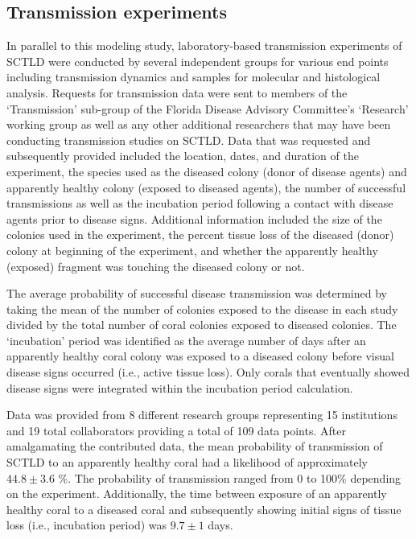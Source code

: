 \documentclass[utf8]{frontiersSCNS}
\begin{document}
\subsection{Transmission experiments}
In parallel to this modeling study, laboratory-based transmission experiments of SCTLD were conducted by several independent groups for various end points including transmission dynamics and samples for molecular and histological analysis. Requests for transmission data were sent to members of the ‘Transmission’ sub-group of the Florida Disease Advisory Committee’s ‘Research’ working group as well as any other additional researchers that may have been conducting transmission studies on SCTLD. Data that was requested and subsequently provided included the location, dates, and duration of the experiment, the species used as the diseased colony (donor of disease agents) and apparently healthy colony (exposed to diseased agents), the number of successful transmissions as well as the incubation period following a contact with disease agents prior to disease signs. Additional information included the size of the colonies used in the experiment, the percent tissue loss of the diseased (donor) colony at beginning of the experiment, and whether the apparently healthy (exposed) fragment was touching the diseased colony or not. 

The average probability of successful disease transmission was determined by taking the mean of the number of colonies exposed to the disease in each study divided by the total number of coral colonies exposed to diseased colonies. The ‘incubation’ period was identified as the average number of days after an apparently healthy coral colony was exposed to a diseased colony before visual disease signs occurred (i.e., active tissue loss). Only corals that eventually showed disease signs were integrated within the incubation period calculation. 

Data was provided from 8 different research groups representing 15 institutions and 19 total collaborators providing a total of 109 data points. After amalgamating the contributed data, the mean probability of transmission of SCTLD to an apparently healthy coral had a likelihood of approximately $44.8 \pm 3.6$ \%. The probability of transmission ranged from 0 to 100\% depending on the experiment. Additionally, the time between exposure of an apparently healthy coral to a diseased coral and subsequently showing initial signs of tissue loss (i.e., incubation period) was $9.7 \pm 1$ days.  
\end{document}
